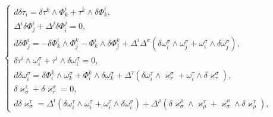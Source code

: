 \begin{equation}


\begin{cases}


d\delta\tau_i=\delta\tau^k\wedge\Phi^i_k+


\tau^k\wedge\delta\Phi^i_k,\\


%


\Delta^i\delta\Phi^i_j+\Delta^j\delta\Phi^j_i=0,\\


%


d\delta\Phi^i_j=-


\delta\Phi^i_k\wedge\Phi^k_j-\Phi^i_k\wedge\delta\Phi^k_j+


\Delta^i\Delta^{\sigma}(


\delta\omega^{\sigma}_i\wedge\omega^{\sigma}_j+


\omega^{\sigma}_i\wedge\delta\omega^{\sigma}_j),\\


%


\delta\tau^i\wedge\omega^{\sigma}_i+\tau^i\wedge\delta


\omega^{\sigma}_i=0,\\


%


d\delta\omega^{\sigma}_i=


\delta\Phi^k_i\wedge\omega^{\sigma}_k+


\Phi^k_i\wedge\delta\omega^{\sigma}_k+\Delta^{\tau}(


\delta\omega^{\tau}_i\wedge\varkappa^{\sigma}_{\tau}+


\omega^{\tau}_i\wedge\delta\varkappa^{\sigma}_{\tau}),\\


%


\delta\varkappa^{\tau}_{\sigma}+\delta\varkappa^{\sigma}_{\tau}=0,\\


%


d\delta\varkappa^{\tau}_{\sigma}=\Delta^i(


\delta\omega^{\tau}_i\wedge\omega^{\sigma}_i+


\omega^{\tau}_i\wedge\delta\omega^{\sigma}_i)+


\Delta^{\rho}(\delta\varkappa^{\rho}_{\sigma}\wedge


\varkappa^{\tau}_{\rho}+


\varkappa^{\rho}_{\sigma}\wedge\delta\varkappa^{\tau}_{\rho}),


\end{cases}


\end{equation}


